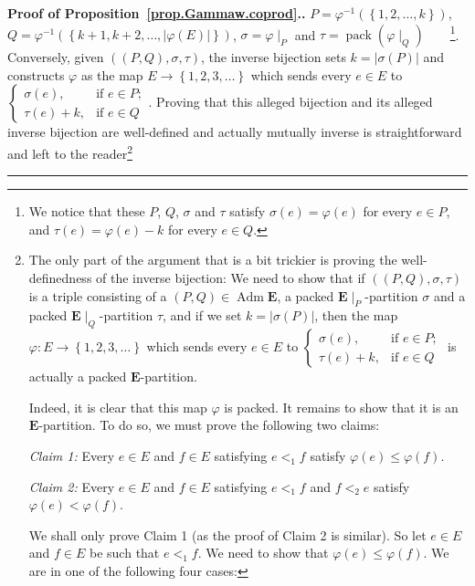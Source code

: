 \documentclass[numbers=enddot,12pt,final,onecolumn,notitlepage,abstracton]{scrartcl}
\theoremstyle{definition}
\newenvironment{proof}[1][Proof]{\noindent\textbf{#1.} }{\ \rule{0.5em}{0.5em}}
\newenvironment{vershort}{}{}
\newcommand{\Adm}{\operatorname{Adm}}
\newcommand{\pack}{\operatorname{pack}}
\newcommand{\EE}{{\mathbf{E}}}
\begin{document}
\begin{vershort}
\begin{proof}[Proof of Proposition~\ref{prop.Gammaw.coprod}.]
$P = \varphi^{-1}\left(\left\{1, 2, \ldots, k\right\}\right)$,
$Q = \varphi^{-1}\left(\left\{k+1, k+2, \ldots, \left|\varphi\left(E\right)\right|\right\}\right)$,
$\sigma = \varphi\mid_P$ and
$\tau = \pack \left(\varphi\mid_Q\right)$\ \ \ \ \footnote{We
notice that these $P$, $Q$, $\sigma$ and $\tau$ satisfy
$\sigma\left(e\right) = \varphi\left(e\right)$ for every
$e \in P$, and $\tau\left(e\right) = \varphi\left(e\right) - k$
for every $e \in Q$.}. Conversely, given
$\left(\left(P, Q\right), \sigma, \tau\right)$,
the inverse bijection
sets $k = \left|\sigma\left(P\right)\right|$ and constructs
$\varphi$ as the map $E \to \left\{1, 2, 3, \ldots\right\}$
which sends every $e \in E$ to
$\begin{cases} \sigma\left(e\right), &\mbox{if } e \in P; \\
\tau\left(e\right) + k, &\mbox{if } e \in Q \end{cases}$.
Proving that this alleged bijection and its alleged inverse
bijection are well-defined and actually mutually inverse is
straightforward and left to the reader\footnote{The only
part of the argument that is a bit trickier is proving the
well-definedness of the inverse bijection: We need to show
that if $\left(\left(P, Q\right), \sigma, \tau
\right)$ is a triple consisting of a
$\left(P, Q\right) \in \Adm \EE$, a packed
$\EE\mid_P$-partition $\sigma$ and a packed $\EE\mid_Q$-partition
$\tau$, and if we set $k = \left|\sigma\left(P\right)\right|$,
then the map $\varphi : E \to \left\{1, 2, 3, \ldots\right\}$
which sends every $e \in E$ to
$\begin{cases} \sigma\left(e\right), &\mbox{if } e \in P; \\
\tau\left(e\right) + k, &\mbox{if } e \in Q \end{cases}$
is actually a packed $\EE$-partition.

Indeed, it is clear that this map $\varphi$ is packed. It remains
to show that it is an $\EE$-partition. To do so, we must prove
the following two claims:

\textit{Claim 1:} Every $e \in E$ and $f \in E$ satisfying
$e <_1 f$ satisfy
$\varphi\left(e\right) \leq \varphi\left(f\right)$.

\textit{Claim 2:} Every $e \in E$ and $f \in E$ satisfying
$e <_1 f$ and $f <_2 e$ satisfy
$\varphi\left(e\right) < \varphi\left(f\right)$.

We shall only prove Claim 1 (as the proof of Claim 2 is
similar). So let $e \in E$ and $f \in E$ be such that
$e <_1 f$. We need to show that
$\varphi\left(e\right) \leq \varphi\left(f\right)$.
We are in one of the following four cases:

}
\end{proof}
\end{vershort}
\end{document}
